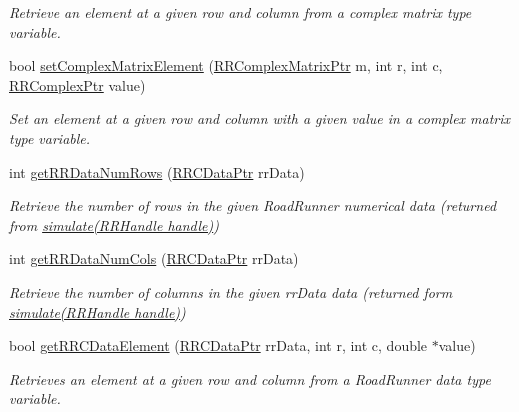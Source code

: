 \begin{DoxyCompactItemize}
\begin{DoxyCompactList}\small\item\em Retrieve an element at a given row and column from a complex matrix type variable. \end{DoxyCompactList}\item 
bool \hyperlink{group__helper_routines_gacbdd712d1e5d677c3849ea2d6dec4001}{set\+Complex\+Matrix\+Element} (\hyperlink{rrc__types_8h_a8cf9e865d8541d100f153800adbb7c3f}{R\+R\+Complex\+Matrix\+Ptr} m, int r, int c, \hyperlink{rrc__types_8h_ada2046d7326c56ae29d8510fbf6622ee}{R\+R\+Complex\+Ptr} value)
\begin{DoxyCompactList}\small\item\em Set an element at a given row and column with a given value in a complex matrix type variable. \end{DoxyCompactList}\item 
int \hyperlink{group__helper_routines_ga0309b51e111e53ee0131d88c118eb260}{get\+R\+R\+Data\+Num\+Rows} (\hyperlink{rrc__types_8h_a9da8b124eb9c3c0045f8926c6a420b4a}{R\+R\+C\+Data\+Ptr} rr\+Data)
\begin{DoxyCompactList}\small\item\em Retrieve the number of rows in the given Road\+Runner numerical data (returned from \hyperlink{group__simulation_ga55c9ef1913377542f61d1d622911cc7b}{simulate(\+R\+R\+Handle handle)}) \end{DoxyCompactList}\item 
int \hyperlink{group__helper_routines_ga94531f474b344dd40357ceb516aef46c}{get\+R\+R\+Data\+Num\+Cols} (\hyperlink{rrc__types_8h_a9da8b124eb9c3c0045f8926c6a420b4a}{R\+R\+C\+Data\+Ptr} rr\+Data)
\begin{DoxyCompactList}\small\item\em Retrieve the number of columns in the given rr\+Data data (returned form \hyperlink{group__simulation_ga55c9ef1913377542f61d1d622911cc7b}{simulate(\+R\+R\+Handle handle)}) \end{DoxyCompactList}\item 
bool \hyperlink{group__helper_routines_gaf9a9af778156ea40a6eafe602ba09259}{get\+R\+R\+C\+Data\+Element} (\hyperlink{rrc__types_8h_a9da8b124eb9c3c0045f8926c6a420b4a}{R\+R\+C\+Data\+Ptr} rr\+Data, int r, int c, double $\ast$value)
\begin{DoxyCompactList}\small\item\em Retrieves an element at a given row and column from a Road\+Runner data type variable. \end{DoxyCompactList}\item 

\end{DoxyCompactItemize}
